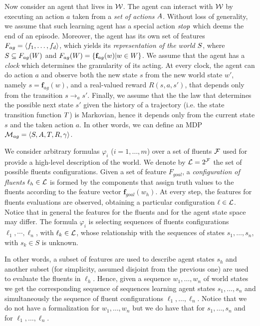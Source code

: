 Now consider an agent that lives in $\mathcal{W}$. The agent can interact with $\mathcal{W}$ by executing an action $a$ taken from a \emph{set of actions} $A$. Without loss of generality, we assume that such learning agent has a special action $\mathit{stop}$ which deems the end of an episode.
Moreover, the agent has its own set of features $F_{ag} = \langle f_1, \dots, f_d \rangle$, which yields its \emph{representation of the world} $S$, where $S \subseteq F_{ag}(W)$ and $F_{ag}(W) = \{\mathbf{f}_{ag}(w) | w \in W\}$. We assume that the agent has a \emph{clock} which determines the granularity of its acting. At every clock, the agent can do action $a$ and observe both the new state $s$ from the new world state $w'$, namely $s = \mathbf{f}_{ag}(w)$, and a real-valued reward $R(s,a,s')$, that depends only from the transition $s\to_a s'$.
Finally, we assume that the the law that determines the possible next state $s'$ given the history of a trajectory (i.e. the state transition function $T$) is Markovian, hence it depends only from the current state $s$ and the taken action $a$. 
In other words, we can define an MDP $\mathcal{M}_{ag} = \langle S, A, T, R, \gamma \rangle$.


We consider arbitrary \LLf formulas $\varphi_i$
($i=1,\ldots,m$) over a set of fluents $\mathcal{F}$ used for provide a high-level description of the world. We denote by $\mathcal{L}=2^{\mathcal{F}}$ the set of possible fluents configurations. 
Given a set of feature $F_{goal}$, a \emph{configuration of fluents} $\ell_h \in \mathcal{L}$ is formed by the components that assign truth values to the fluents according to
the feature vector $\mathbf{f}_{goal}(w_h)$. At every step, the features for fluents evaluations are observed, obtaining a particular configuration $\ell\in\mathcal{L}$. Notice that in general the features for the fluents and for the agent state space may differ. The formula $\varphi_i$ is
selecting sequences of fluents configurations $\ell_1,\cdots,\ell_n$,
with $\ell_k\in \mathcal{L}$, whose relationship with the sequences of states
$s_1,\ldots, s_n$, with $s_k \in S$ is unknown.

 In other words, a subset of features are used to describe agent states $s_h$ and another  subset (for simplicity, assumed disjoint from the previous one) are used to evaluate the fluents in $\ell_h$.
 Hence, given a sequence $w_1,\ldots,w_n$ of
 world states we get the corresponding sequence of sequences learning
 agent states $s_1,\ldots,s_n$ and simultaneously the sequence of fluent
 configurations $\ell_1,\ldots,\ell_n$.  Notice that we do not have a
 formalization for $w_1,\ldots,w_n$ but we do have that for $s_1,\ldots,s_n$
 and for $\ell_1,\ldots,\ell_n$. 


